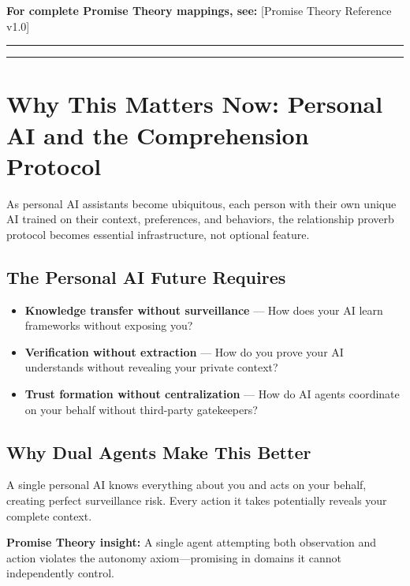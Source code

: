 \documentclass[
]{article}
\begin{document}
\textbf{For complete Promise Theory mappings, see:} {[}Promise Theory
Reference v1.0{]}

\begin{center}\rule{0.5\linewidth}{0.5pt}\end{center}

\begin{center}\rule{0.5\linewidth}{0.5pt}\end{center}

\section{Why This Matters Now: Personal AI and the Comprehension
Protocol}\label{why-this-matters-now-personal-ai-and-the-comprehension-protocol}

As personal AI assistants become ubiquitous, each person with their own
unique AI trained on their context, preferences, and behaviors, the
relationship proverb protocol becomes essential infrastructure, not
optional feature.

\subsection{The Personal AI Future
Requires}\label{the-personal-ai-future-requires}

\begin{itemize}
\item
  \textbf{Knowledge transfer without surveillance} --- How does your AI
  learn frameworks without exposing you?
\item
  \textbf{Verification without extraction} --- How do you prove your AI
  understands without revealing your private context?
\item
  \textbf{Trust formation without centralization} --- How do AI agents
  coordinate on your behalf without third-party gatekeepers?
\end{itemize}

\subsection{Why Dual Agents Make This
Better}\label{why-dual-agents-make-this-better}

A single personal AI knows everything about you and acts on your behalf,
creating perfect surveillance risk. Every action it takes potentially
reveals your complete context.

\textbf{Promise Theory insight:} A single agent attempting both
observation and action violates the autonomy axiom---promising in
domains it cannot independently control.
\end{document}
